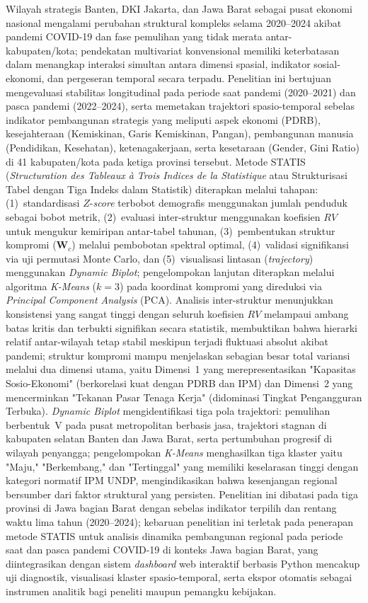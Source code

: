 \begin{singlespace}
Wilayah strategis Banten, DKI Jakarta, dan Jawa Barat sebagai pusat ekonomi nasional mengalami perubahan struktural kompleks selama 2020--2024 akibat pandemi COVID-19 dan fase pemulihan yang tidak merata antar-kabupaten/kota; pendekatan multivariat konvensional memiliki keterbatasan dalam menangkap interaksi simultan antara dimensi spasial, indikator sosial-ekonomi, dan pergeseran temporal secara terpadu. Penelitian ini bertujuan mengevaluasi stabilitas longitudinal pada periode saat pandemi (2020--2021) dan pasca pandemi (2022--2024), serta memetakan trajektori spasio-temporal sebelas indikator pembangunan strategis yang meliputi aspek ekonomi (PDRB), kesejahteraan (Kemiskinan, Garis Kemiskinan, Pangan), pembangunan manusia (Pendidikan, Kesehatan), ketenagakerjaan, serta kesetaraan (Gender, Gini Ratio) di 41 kabupaten/kota pada ketiga provinsi tersebut. Metode STATIS (\textit{Structuration des Tableaux à Trois Indices de la Statistique} atau Strukturisasi Tabel dengan Tiga Indeks dalam Statistik) diterapkan melalui tahapan: (1)~standardisasi $Z$-\textit{score} terbobot demografis menggunakan jumlah penduduk sebagai bobot metrik, (2)~evaluasi inter-struktur menggunakan koefisien $RV$ untuk mengukur kemiripan antar-tabel tahunan, (3)~pembentukan struktur kompromi ($\mathbf{W}_c$) melalui pembobotan spektral optimal, (4)~validasi signifikansi via uji permutasi Monte Carlo, dan (5)~visualisasi lintasan (\textit{trajectory}) menggunakan \textit{Dynamic Biplot}; pengelompokan lanjutan diterapkan melalui algoritma \textit{K-Means} ($k=3$) pada koordinat kompromi yang direduksi via \textit{Principal Component Analysis} (PCA). Analisis inter-struktur menunjukkan konsistensi yang sangat tinggi dengan seluruh koefisien $RV$ melampaui ambang batas kritis dan terbukti signifikan secara statistik, membuktikan bahwa hierarki relatif antar-wilayah tetap stabil meskipun terjadi fluktuasi absolut akibat pandemi; struktur kompromi mampu menjelaskan sebagian besar total variansi melalui dua dimensi utama, yaitu Dimensi~1 yang merepresentasikan "Kapasitas Sosio-Ekonomi" (berkorelasi kuat dengan PDRB dan IPM) dan Dimensi~2 yang mencerminkan "Tekanan Pasar Tenaga Kerja" (didominasi Tingkat Pengangguran Terbuka). \textit{Dynamic Biplot} mengidentifikasi tiga pola trajektori: pemulihan berbentuk~V pada pusat metropolitan berbasis jasa, trajektori stagnan di kabupaten selatan Banten dan Jawa Barat, serta pertumbuhan progresif di wilayah penyangga; pengelompokan \textit{K-Means} menghasilkan tiga klaster yaitu "Maju," "Berkembang," dan "Tertinggal" yang memiliki keselarasan tinggi dengan kategori normatif IPM UNDP, mengindikasikan bahwa kesenjangan regional bersumber dari faktor struktural yang persisten. Penelitian ini dibatasi pada tiga provinsi di Jawa bagian Barat dengan sebelas indikator terpilih dan rentang waktu lima tahun (2020--2024); kebaruan penelitian ini terletak pada penerapan metode STATIS untuk analisis dinamika pembangunan regional pada periode saat dan pasca pandemi COVID-19 di konteks Jawa bagian Barat, yang diintegrasikan dengan sistem \textit{dashboard} web interaktif berbasis Python mencakup uji diagnostik, visualisasi klaster spasio-temporal, serta ekspor otomatis sebagai instrumen analitik bagi peneliti maupun pemangku kebijakan.


\end{singlespace}
